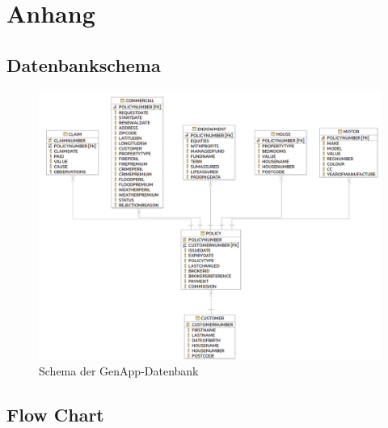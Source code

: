 \chapter{Anhang}
\label{cha:anhang}

\section{Datenbankschema}
\label{anhang:datenbankschema}

\begin{figure}[h]
 \centering
   \includegraphics[scale=0.4]{images/anhang/datenbank.png}
 \caption{Schema der GenApp-Datenbank}
\end{figure}

\newpage

\section{Flow Chart}
\label{anhang:flowchart}

